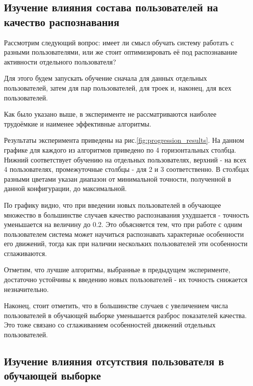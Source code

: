 \subsection{Изучение влияния состава пользователей на качество распознавания}

Рассмотрим следующий вопрос: имеет ли смысл обучать систему работать с разными пользователями, или же стоит оптимизировать её под распознавание активности отдельного пользователя?

Для этого будем запускать обучение сначала для данных отдельных пользователей, затем для пар пользователей, для троек и, наконец, для всех пользователей.

Как было указано выше, в эксперименте не рассматриваются наиболее трудоёмкие и наименее эффективные алгоритмы.

Результаты эксперимента приведены на рис.\ref{fig:progression_results}. На данном графике для каждого из алгоритмов приведено по 4 горизонтальных столбца. Нижний соответствует обучению на отдельных пользователях, верхний - на всех 4 пользователях, промежуточные столбцы - для 2 и 3 соответственно. В столбцах разными цветами указан диапазон от минимальной точности, полученной в данной конфигурации, до максимальной.


По графику видно, что при введении новых пользователей в обучающее множество в большинстве случаев качество распознавания ухудшается - точность уменьшается на величину до 0.2. Это объясняется тем, что при работе с одним пользователем система может научиться распознавать характерные особенности его движений, тогда как при наличии нескольких пользователей эти особенности сглаживаются.

Отметим, что лучшие алгоритмы, выбранные в предыдущем эксперименте, достаточно устойчивы к введению новых пользователей - их точность снижается незначительно. 

Наконец, стоит отметить, что в большинстве случаев с увеличением числа пользователей в обучающей выборке уменьшается разброс показателей качества. Это тоже связано со сглаживанием особенностей движений отдельных пользователей.

\subsection{Изучение влияния отсутствия пользователя в обучающей выборке}


